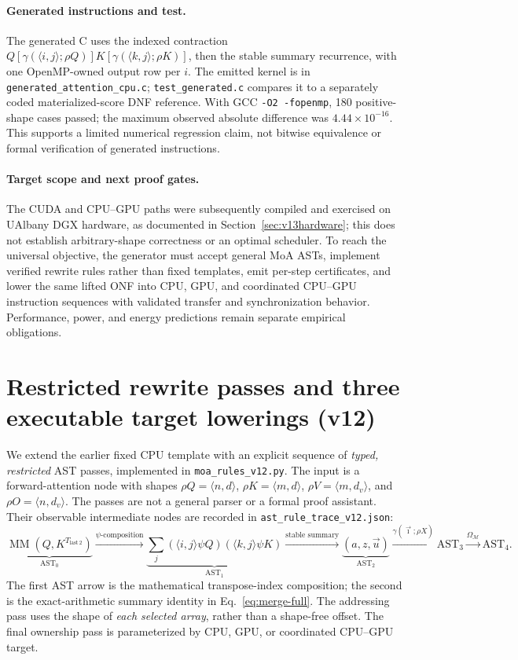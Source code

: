 \documentclass[11pt]{article}
\begin{document}
\paragraph{Generated instructions and test.}
The generated C uses the indexed contraction $Q[\gamma(\langle i,j\rangle;\rho Q)]K[\gamma(\langle k,j\rangle;\rho K)]$, then the stable summary recurrence, with one OpenMP-owned output row per $i$. The emitted kernel is in \texttt{generated\_attention\_cpu.c}; \texttt{test\_generated.c} compares it to a separately coded materialized-score DNF reference. With GCC \texttt{-O2 -fopenmp}, 180 positive-shape cases passed; the maximum observed absolute difference was $4.44\times10^{-16}$. This supports a limited numerical regression claim, not bitwise equivalence or formal verification of generated instructions.

\paragraph{Target scope and next proof gates.}
The CUDA and CPU--GPU paths were subsequently compiled and exercised on UAlbany DGX hardware, as documented in Section~\ref{sec:v13hardware}; this does not establish arbitrary-shape correctness or an optimal scheduler. To reach the universal objective, the generator must accept general MoA ASTs, implement verified rewrite rules rather than fixed templates, emit per-step certificates, and lower the same lifted ONF into CPU, GPU, and coordinated CPU--GPU instruction sequences with validated transfer and synchronization behavior. Performance, power, and energy predictions remain separate empirical obligations.


\section{Restricted rewrite passes and three executable target lowerings (v12)}
\label{sec:threebackends}
We extend the earlier fixed CPU template with an explicit sequence of \emph{typed, restricted} AST passes, implemented in \texttt{moa\_rules\_v12.py}. The input is a forward-attention node with shapes $\rho Q=\langle n,d\rangle$, $\rho K=\langle m,d\rangle$, $\rho V=\langle m,d_v\rangle$, and $\rho O=\langle n,d_v\rangle$. The passes are not a general parser or a formal proof assistant. Their observable intermediate nodes are recorded in \texttt{ast\_rule\_trace\_v12.json}:
\begin{equation}
\underbrace{\operatorname{MM}(Q,K^{T_{\mathrm{last}\,2}})}_{\mathrm{AST}_0}
\xrightarrow{\psi\text{-composition}}
\underbrace{\sum_j (\langle i,j\rangle\psi Q)(\langle k,j\rangle\psi K)}_{\mathrm{AST}_1}
\xrightarrow{\text{stable summary}}
\underbrace{(a,z,\vec u)}_{\mathrm{AST}_2}
\xrightarrow{\gamma(\vec\imath;\rho X)}
\mathrm{AST}_3
\xrightarrow{\Omega_{\mathcal M}}\mathrm{AST}_4.
\end{equation}
The first AST arrow is the mathematical transpose-index composition; the second is the exact-arithmetic summary identity in Eq.~\eqref{eq:merge-full}. The addressing pass uses the shape of \emph{each selected array}, rather than a shape-free offset. The final ownership pass is parameterized by CPU, GPU, or coordinated CPU--GPU target.
\end{document}
